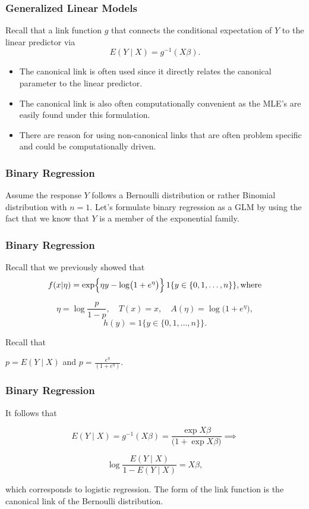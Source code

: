 \documentclass{beamer}
\begin{document}
\begin{frame}
\frametitle{Generalized Linear Models}

Recall that a link function $g$ that connects the conditional expectation of $Y$ to the linear predictor
via
$$E(Y \mid X) = g^{-1}(X \beta).$$

\vspace*{1em}

\begin{itemize}
\item The canonical link is often used since it directly relates the canonical parameter to the linear predictor. 
\item The canonical link is also often computationally convenient as the MLE's are easily found under this formulation. 
\item There are reason for using non-canonical links that are often problem specific and could be computationally driven. 
\end{itemize} 
\end{frame}

\begin{frame}
\frametitle{Binary Regression}

Assume the response $Y$ follows a Bernoulli distribution or rather Binomial distribution with $n=1.$ Let's formulate binary regression as a GLM by using the fact that we know that $Y$ is a member of the exponential family. 

\end{frame}

\begin{frame}
\frametitle{Binary Regression}
Recall that we previously showed that
\[
f(x|\eta) = \exp\Bigl\{\eta y - \log\bigl(1+e^\eta\bigr)\Bigr\}\, 1\{y \in \{0,1,\dots,n\}\}, \text{where} 
\]

$$
\eta = \log\frac{p}{1-p}, \quad T(x)=x,\quad A(\eta)= \log\bigl(1+e^\eta\bigr),$$
$$h(y)= 1\{y \in \{0,1,\dots,n\}\}.$$

\vspace*{1em}

Recall that

$p = E(Y \mid X)$ and $p = \frac{e^{\eta}}{(1 + e^{\eta})}.$
\end{frame}

\begin{frame}
\frametitle{Binary Regression}

It follows that 

$$ E(Y \mid X) = g^{-1}(X \beta) = \frac{\exp{X \beta}}{(1 + \exp{X \beta)}} \implies$$

$$ \log \frac{E(Y \mid X)}{1 - E(Y \mid X)} = X\beta,$$

which corresponds to logistic regression. The form of the link function is the canonical link of the Bernoulli distribution. 

\end{frame}
\end{document}
